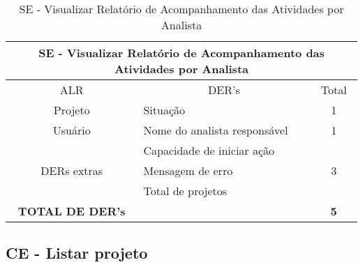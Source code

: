       \begin{table}[!h]
      \centering
      \caption{SE - Visualizar Relatório de Acompanhamento das Atividades por Analista}
      \label{se_visualizar_relatorio_acompanhamento_analista}
      \begin{tabular}{|c|l|c|}
      \hline
      \multicolumn{3}{|c|}{SE - Visualizar Relatório de Acompanhamento das Atividades por Analista} \\ \hline
      ALR                               & \multicolumn{1}{c|}{DER's}       & Total                  \\ \hline
      Projeto                           & Situação                         & 1                      \\ \hline
      Usuário                           & Nome do analista responsável     & 1                      \\ \hline
      \multirow{3}{*}{DERs extras}      & Capacidade de iniciar ação       & \multirow{3}{*}{3}     \\ \cline{2-2}
					& Mensagem de erro                 &                        \\ \cline{2-2}
					& Total de projetos                &                        \\ \hline
      \textbf{TOTAL DE DER's}           &                                  & \textbf{5}             \\ \hline
      \end{tabular}
      \end{table}
  
  \vfill
  \pagebreak
  \subsection{CE - Listar projeto}
  
